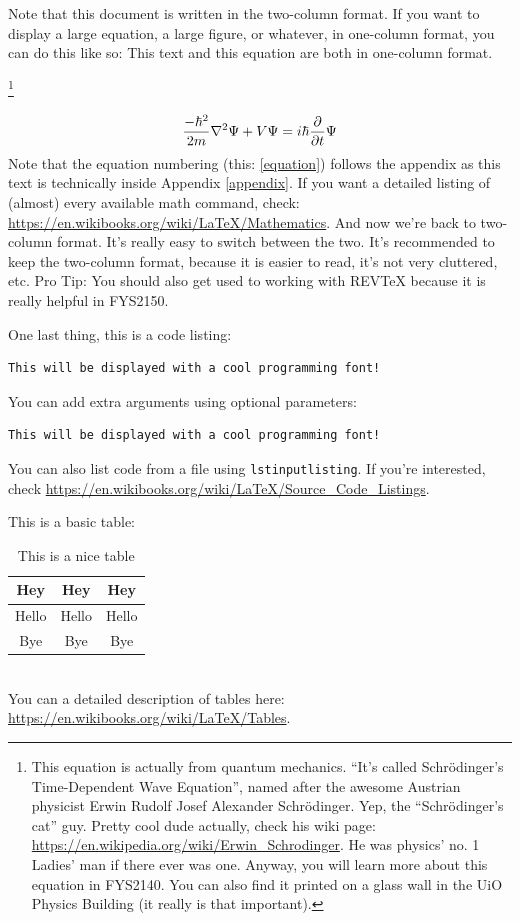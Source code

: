 \documentclass[reprint,english,notitlepage]{revtex4-1}  %
\begin{document}
\clearpage
Note that this document is written in the two-column format. If you want to display a large equation, a large figure, or whatever, in one-column format, you can do this like so:
\onecolumngrid
\vspace{1cm} %
This text and this equation are both in one-column format.

\footnote{This equation is actually from quantum mechanics. ``It's called Schrödinger's Time-Dependent Wave Equation'', named after the awesome Austrian physicist Erwin Rudolf Josef Alexander Schrödinger. Yep, the ``Schrödinger's cat'' guy. Pretty cool dude actually, check his wiki page: \url{https://en.wikipedia.org/wiki/Erwin_Schrodinger}. He was physics' no. 1 Ladies' man if there ever was one. Anyway, you will learn more about this equation in FYS2140. You can also find it printed on a glass wall in the UiO Physics Building (it really is that important).}

\begin{equation}\label{equation}
\frac{-\hbar^2}{2m}\laplacian{\Psi}+V\Psi=i\hbar\pdv{t}\Psi
\end{equation}
Note that the equation numbering (this: \ref{equation}) follows the appendix as this text is technically inside Appendix \ref{appendix}. If you want a detailed listing of (almost) every available math command, check: \url{https://en.wikibooks.org/wiki/LaTeX/Mathematics}.
\vspace{1cm} %
\twocolumngrid
And now we're back to two-column format. It's really easy to switch between the two. It's recommended to keep the two-column format, because it is easier to read, it's not very cluttered, etc. Pro Tip: You should also get used to working with REVTeX because it is really helpful in FYS2150.

One last thing, this is a code listing:
\begin{lstlisting}
This will be displayed with a cool programming font!
\end{lstlisting}
You can add extra arguments using optional parameters:
\begin{lstlisting}[morekeywords={cool}]
This will be displayed with a cool programming font!
\end{lstlisting}
You can also list code from a file using \texttt{lstinputlisting}. If you're interested, check \url{https://en.wikibooks.org/wiki/LaTeX/Source_Code_Listings}.

This is a basic table:
\begin{table}[h]  %
\caption{This is a nice table}\label{table}
\begin{tabular}{|c|c|c|} %
\hline                    %
Hey & Hey & Hey  \\
\hline
Hello & Hello & Hello \\
\hline
Bye & Bye & Bye \\
\hline
\end{tabular}
\end{table}\\
You can a detailed description of tables here: \url{https://en.wikibooks.org/wiki/LaTeX/Tables}.
\end{document}

